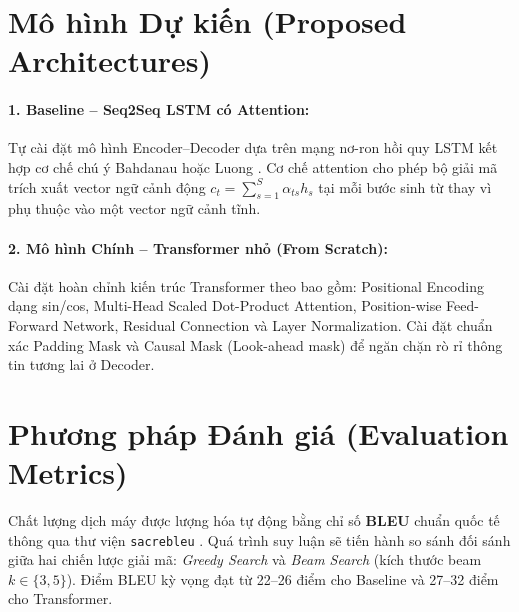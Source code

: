 \documentclass[11pt]{article}
\begin{document}
\section{Mô hình Dự kiến (Proposed Architectures)}
\paragraph{1. Baseline -- Seq2Seq LSTM có Attention:}
Tự cài đặt mô hình Encoder--Decoder dựa trên mạng nơ-ron hồi quy LSTM \cite{sutskever2014sequence} kết hợp cơ chế chú ý Bahdanau \cite{bahdanau2014neural} hoặc Luong \cite{luong2015effective}. Cơ chế attention cho phép bộ giải mã trích xuất vector ngữ cảnh động $c_t = \sum_{s=1}^{S} \alpha_{ts} h_s$ tại mỗi bước sinh từ thay vì phụ thuộc vào một vector ngữ cảnh tĩnh.

\paragraph{2. Mô hình Chính -- Transformer nhỏ (From Scratch):}
Cài đặt hoàn chỉnh kiến trúc Transformer theo \citet{vaswani2017attention} bao gồm: Positional Encoding dạng sin/cos, Multi-Head Scaled Dot-Product Attention, Position-wise Feed-Forward Network, Residual Connection và Layer Normalization. Cài đặt chuẩn xác Padding Mask và Causal Mask (Look-ahead mask) để ngăn chặn rò rỉ thông tin tương lai ở Decoder.

\section{Phương pháp Đánh giá (Evaluation Metrics)}
Chất lượng dịch máy được lượng hóa tự động bằng chỉ số \textbf{BLEU} chuẩn quốc tế thông qua thư viện \texttt{sacrebleu} \cite{post2018call}. Quá trình suy luận sẽ tiến hành so sánh đối sánh giữa hai chiến lược giải mã: \textit{Greedy Search} và \textit{Beam Search} (kích thước beam $k \in \{3, 5\}$). Điểm BLEU kỳ vọng đạt từ 22--26 điểm cho Baseline và 27--32 điểm cho Transformer.
\end{document}
